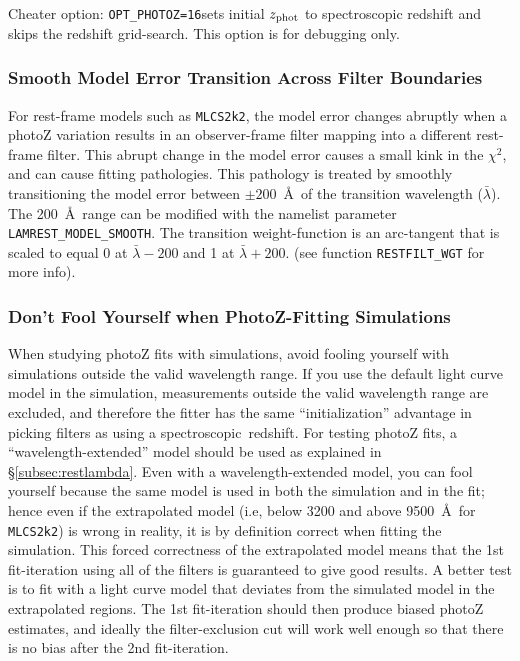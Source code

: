 \documentclass[12pt]{article}
\newcommand{\mlcs}{{\tt MLCS2k2}}
\newcommand{\Zphot}{z_{\rm phot}}
\newcommand{\spec}{spectroscopic}
\begin{document}
Cheater option: \verb|OPT_PHOTOZ=16|sets initial $\Zphot$
to spectroscopic redshift and skips the redshift grid-search. 
This option is for debugging only.


   \subsubsection{Smooth Model Error Transition Across Filter Boundaries}
   \label{sss:smooth_model}

For rest-frame models such as \mlcs, the model error
changes abruptly when a photoZ variation results
in an observer-frame filter mapping into a different
rest-frame filter. This abrupt change in the model error
causes a small kink in the $\chi^2$, and can cause
fitting pathologies.   This pathology is treated by
smoothly transitioning the model error between
$\pm 200$~\AA\ of the transition wavelength ($\bar{\lambda}$).
The 200~\AA\ range can be modified with the namelist
parameter {\tt LAMREST\_MODEL\_SMOOTH}.
The transition weight-function is an arc-tangent that is scaled
to equal 0 at $\bar{\lambda}-200$ and 1 at $\bar{\lambda}+200$.
(see function {\tt RESTFILT\_WGT} for more info).

   \subsubsection{Don't Fool Yourself when PhotoZ-Fitting Simulations}
   \label{sss:photoz_fool}

When studying photoZ fits with simulations, 
avoid fooling yourself with simulations outside 
the valid wavelength range.
If you use the default light curve model in the simulation,
measurements outside the valid wavelength range
are excluded, and therefore the fitter has the same
``initialization'' advantage in picking filters 
as using a \spec\ redshift.  For testing photoZ fits,
a ``wavelength-extended'' model should be used
as explained in \S\ref{subsec:restlambda}.
Even with a wavelength-extended model, you can fool yourself
because the same model is used in both the simulation 
and in the fit; hence even if the extrapolated
model (i.e, below 3200 and above 9500~\AA\ for {\mlcs}) 
is wrong in reality, it is by definition correct when
fitting the simulation. This forced correctness of the
extrapolated model means that the 1st fit-iteration
using all of the filters is guaranteed to give
good results.  A better test is to fit with a light curve model
that deviates from the simulated model in the extrapolated
regions. The 1st fit-iteration should then produce
biased photoZ estimates, and ideally the filter-exclusion
cut will work well enough so that there is no bias
after the 2nd fit-iteration.
\end{document}
